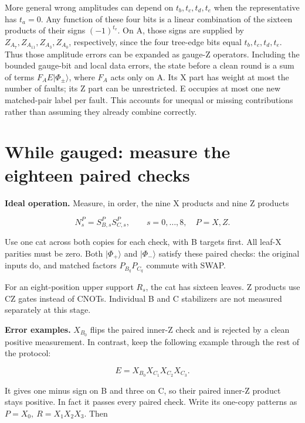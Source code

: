 \documentclass[11pt]{article}
\begin{document}
More general wrong amplitudes can depend on \(t_b,t_c,t_d,t_e\) when the representative has \(t_a=0\). Any function of these four bits is a linear combination of the sixteen products of their signs \((-1)^{t_v}\). On A, those signs are supplied by \(Z_{A_7},Z_{A_{11}},Z_{A_3},Z_{A_0}\), respectively, since the four tree-edge bits equal \(t_b,t_c,t_d,t_e\). Thus those amplitude errors can be expanded as gauge-Z operators. Including the bounded gauge-bit and local data errors, the state before a clean round is a sum of terms \(F_A E|\Phi_\pm\rangle\), where \(F_A\) acts only on A. Its X part has weight at most the number of faults; its Z part can be unrestricted. E occupies at most one new matched-pair label per fault. This accounts for unequal or missing contributions rather than assuming they already combine correctly.

\section{While gauged: measure the eighteen paired checks}
\textbf{Ideal operation.} Measure, in order, the nine X products and nine Z products

\[
N_s^P=S^P_{B,s}S^P_{C,s},\qquad s=0,\ldots,8,\quad P=X,Z.
\]

Use one cat across both copies for each check, with B targets first. All leaf-X parities must be zero. Both \(|\Phi_+\rangle\) and \(|\Phi_-\rangle\) satisfy these paired checks: the original inputs do, and matched factors \(P_{B_q}P_{C_q}\) commute with SWAP.

\begin{center}\begin{minipage}{\linewidth}

\end{minipage}\end{center}

For an eight-position upper support \(R_s\), the cat has sixteen leaves. Z products use CZ gates instead of CNOTs. Individual B and C stabilizers are not measured separately at this stage.

\textbf{Error examples.} \(X_{B_0}\) flips the paired inner-Z check and is rejected by a clean positive measurement. In contrast, keep the following example through the rest of the protocol:

\[
E=X_{B_0}X_{C_1}X_{C_2}X_{C_3}.
\]

It gives one minus sign on B and three on C, so their paired inner-Z product stays positive. In fact it passes every paired check. Write its one-copy patterns as \(P=X_0,\ R=X_1X_2X_3\). Then
\end{document}
